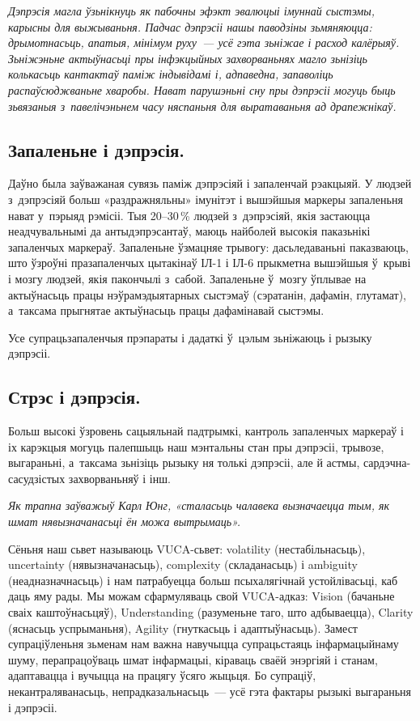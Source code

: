 \emph{Дэпрэсія магла ўзьнікнуць як пабочны эфэкт эвалюцыі імуннай сыстэмы, карысны для выжываньня. Падчас дэпрэсіі нашы паводзіны зьмяняюцца: дрымотнасьць, апатыя, мінімум руху~--- усё гэта зьніжае і расход калёрыяў. Зьніжэньне актыўнасьці пры інфэкцыйных захворваньнях магло зьнізіць колькасьць кантактаў паміж індывідамі і, адпаведна, запаволіць распаўсюджваньне хваробы. Нават парушэньні сну пры дэпрэсіі могуць быць зьвязаныя з~павелічэньнем часу няспаньня для выратаваньня ад драпежнікаў.}

\subsection*{Запаленьне і дэпрэсія.}

Даўно была заўважаная сувязь паміж дэпрэсіяй і запаленчай рэакцыяй. У людзей з~дэпрэсіяй больш «раздражняльны» імунітэт і вышэйшыя маркеры запаленьня нават у~пэрыяд рэмісіі. Тыя 20--30\,\% людзей з~дэпрэсіяй, якія застаюцца неадчувальнымі да антыдэпрэсантаў, маюць найболей высокія паказьнікі запаленчых маркераў. Запаленьне ўзмацняе трывогу: дасьледаваньні паказваюць, што ўзроўні празапаленчых цытакінаў ІЛ-1 і ІЛ-6 прыкметна вышэйшыя ў~крыві і мозгу людзей, якія пакончылі з~сабой. Запаленьне ў~мозгу ўплывае на актыўнасьць працы нэўрамэдыятарных сыстэмаў (сэратанін, дафамін, глутамат), а~таксама прыгнятае актыўнасьць працы дафамінавай сыстэмы. 

Усе супрацьзапаленчыя прэпараты і дадаткі ў~цэлым зьніжаюць і рызыку дэпрэсіі.

\subsection*{Стрэс і дэпрэсія.}

Больш высокі ўзровень сацыяльнай падтрымкі, кантроль запаленчых маркераў і іх карэкцыя могуць палепшыць наш мэнтальны стан пры дэпрэсіі, трывозе, выгараньні, а~таксама зьнізіць рызыку ня толькі дэпрэсіі, але й астмы, сардэчна-сасудзістых захворваньняў і інш.

\emph{Як трапна заўважыў Карл Юнг, «сталасьць чалавека вызначаецца тым, як шмат нявызначанасьці ён можа вытрымаць».}

Сёньня наш сьвет называюць VUCA-сьвет: volatility (нестабільнасьць), uncertainty (нявызначанасьць), complexity (складанасьць) і ambiguity (неадназначнасьць) і нам патрабуецца больш псыхалягічнай устойлівасьці, каб даць яму рады. Мы можам сфармуляваць свой VUCA-адказ: Vision (бачаньне сваіх каштоўнасьцяў), Understanding (разуменьне таго, што адбываецца), Clarity (яснасьць успрыманьня), Agility (гнуткасьць і адаптыўнасьць). Замест супраціўленьня зьменам нам важна навучыцца супрацьстаяць інфармацыйнаму шуму, перапрацоўваць шмат інфармацыі, кіраваць сваёй энэргіяй і станам, адаптавацца і вучыцца на працягу ўсяго жыцьця. Бо супраціў, некантраляванасьць, непрадказальнасьць~--- усё гэта фактары рызыкі выгараньня і дэпрэсіі.

